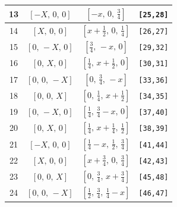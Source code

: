\documentclass[fleqn,8pt]{jsarticle}
\begin{document}
\begin{longtable}{cccc}
13 & $\left[ - X,\, 0,\, 0 \right]$ & $\left[ - x,\, 0,\, \frac{3}{4} \right]$ & {\tt [25,28]} \\ \hline
14 & $\left[ X,\, 0,\, 0 \right]$ & $\left[ x + \frac{1}{2},\, 0,\, \frac{1}{4} \right]$ & {\tt [26,27]} \\ \hline
15 & $\left[ 0,\, - X,\, 0 \right]$ & $\left[ \frac{3}{4},\, - x,\, 0 \right]$ & {\tt [29,32]} \\ \hline
16 & $\left[ 0,\, X,\, 0 \right]$ & $\left[ \frac{1}{4},\, x + \frac{1}{2},\, 0 \right]$ & {\tt [30,31]} \\ \hline
17 & $\left[ 0,\, 0,\, - X \right]$ & $\left[ 0,\, \frac{3}{4},\, - x \right]$ & {\tt [33,36]} \\ \hline
18 & $\left[ 0,\, 0,\, X \right]$ & $\left[ 0,\, \frac{1}{4},\, x + \frac{1}{2} \right]$ & {\tt [34,35]} \\ \hline
19 & $\left[ 0,\, - X,\, 0 \right]$ & $\left[ \frac{1}{4},\, \frac{3}{4} - x,\, 0 \right]$ & {\tt [37,40]} \\ \hline
20 & $\left[ 0,\, X,\, 0 \right]$ & $\left[ \frac{1}{4},\, x + \frac{1}{4},\, \frac{1}{2} \right]$ & {\tt [38,39]} \\ \hline
21 & $\left[ - X,\, 0,\, 0 \right]$ & $\left[ \frac{1}{4} - x,\, \frac{1}{2},\, \frac{3}{4} \right]$ & {\tt [41,44]} \\ \hline
22 & $\left[ X,\, 0,\, 0 \right]$ & $\left[ x + \frac{3}{4},\, 0,\, \frac{3}{4} \right]$ & {\tt [42,43]} \\ \hline
23 & $\left[ 0,\, 0,\, X \right]$ & $\left[ 0,\, \frac{3}{4},\, x + \frac{3}{4} \right]$ & {\tt [45,48]} \\ \hline
24 & $\left[ 0,\, 0,\, - X \right]$ & $\left[ \frac{1}{2},\, \frac{3}{4},\, \frac{1}{4} - x \right]$ & {\tt [46,47]} \\
\end{longtable}
\renewcommand{\arraystretch}{1.2}
\end{document}
